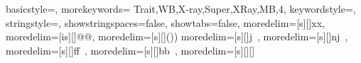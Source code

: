 \usepackage{listings}
\usepackage{subfiles}
\usepackage{textcomp}
\usepackage{xcolor}
\usepackage[ampersand]{easylist}

{
  basicstyle=\ttfamily,
  morekeywords={
  Trait,WB,X-ray,Super,XRay,MB,4},
  keywordstyle=\color{red},
  stringstyle=\color{red},
  showstringspaces=false,
  showtabs=false,
  moredelim=[s][\color{blue}]{x}{x},
  moredelim=[is][\color{violet}]{@}{@},
  moredelim=[s][\color{darkgray}]{()}{)}
  moredelim=[s][\color{gray}]{j}{\ },
  moredelim=[s][\color{gray}]{nj}{\ },
  moredelim=[s][\color{green}]{ff}{\ },
moredelim=[s][\color{green}]{bb}{\ },
moredelim=[s][\color{teal}]{[}{]}
}